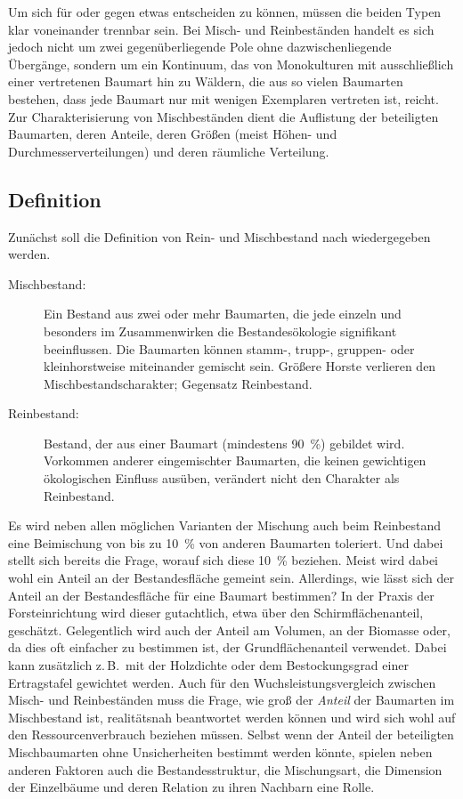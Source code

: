 \documentclass[twocolumn, paper=a4, fontsize=10pt, bibliography=totoc, index=totoc]{scrartcl}
\begin{document}
Um sich für oder gegen etwas entscheiden zu können, müssen die beiden Typen klar
voneinander trennbar sein. Bei Misch- und Reinbeständen handelt es sich jedoch
nicht um zwei gegenüberliegende Pole ohne dazwischenliegende Übergänge, sondern
um ein Kontinuum, das von Monokulturen mit ausschließlich einer vertretenen
Baumart hin zu Wäldern, die aus so vielen Baumarten bestehen, dass jede Baumart
nur mit wenigen Exemplaren vertreten ist, reicht. Zur Charakterisierung von
Mischbeständen dient die Auflistung der beteiligten Baumarten, deren Anteile,
deren Größen (meist Höhen- und Durchmesserverteilungen) und deren räumliche Verteilung.

\subsection{Definition}
\label{ssec:definition}

Zunächst soll die Definition von Rein- und Mischbestand nach
\cite{bruenig1980WaldbaulicheTerminologi} wiedergegeben werden.

\begin{description}
\item[Mischbestand:]  Ein Bestand aus zwei oder
  mehr Baumarten, die jede einzeln und besonders im Zusammenwirken die
  Bestandesökologie signifikant beeinflussen. Die Baumarten können stamm-,
  trupp-, gruppen- oder kleinhorstweise miteinander gemischt sein. Größere
  Horste verlieren den Mischbestandscharakter; Gegensatz Reinbestand.
\item[Reinbestand:] Bestand, der aus einer
  Baumart (mindestens \qty{90}{\percent}) gebildet wird. Vorkommen anderer eingemischter
  Baumarten, die keinen gewichtigen ökologischen Einfluss ausüben, verändert
  nicht den Charakter als Reinbestand.
\end{description}

Es wird neben allen möglichen Varianten der Mischung auch beim Reinbestand
eine Beimischung von bis zu \qty{10}{\percent} von anderen Baumarten toleriert. Und dabei
stellt sich bereits die Frage, worauf sich diese \qty{10}{\percent} beziehen. Meist wird
dabei wohl ein Anteil an der Bestandesfläche gemeint sein. Allerdings, wie lässt
sich der Anteil an der Bestandesfläche für eine Baumart bestimmen? In der Praxis
der Forsteinrichtung wird dieser gutachtlich, etwa über den Schirmflächenanteil,
geschätzt. Gelegentlich wird auch der Anteil am Volumen, an der Biomasse oder,
da dies oft einfacher zu bestimmen ist, der Grundflächenanteil verwendet. Dabei
kann zusätzlich z.\,B.\ mit der Holzdichte oder dem Bestockungsgrad einer
Ertragstafel gewichtet werden. Auch für den Wuchsleistungsvergleich zwischen
Misch- und Reinbeständen muss die Frage, wie groß der \emph{Anteil} der
Baumarten im Mischbestand ist, realitätsnah beantwortet werden können und wird
sich wohl auf den Ressourcenverbrauch beziehen müssen. Selbst wenn der Anteil
der beteiligten Mischbaumarten ohne Unsicherheiten bestimmt werden könnte,
spielen neben anderen Faktoren auch die Bestandesstruktur, die Mischungsart,
die Dimension der Einzelbäume und deren Relation zu ihren Nachbarn eine Rolle.
\end{document}
